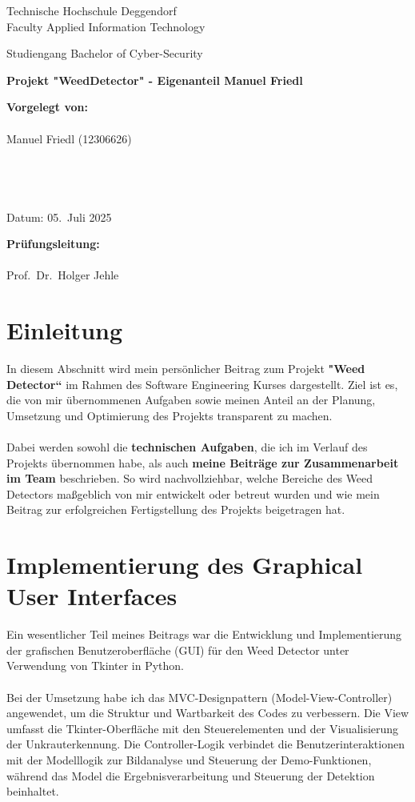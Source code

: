 \documentclass[12pt, a4paper]{scrreprt}
\newcommand{\faculty}{Faculty Applied Information Technology}
\newcommand{\studies}{Bachelor of Cyber-Security}
\newcommand{\thesistitleDE}{Projekt "WeedDetector" - Eigenanteil Manuel Friedl}
\newcommand{\submissiondate}{05.\ Juli 2025}
\newcommand{\supervisor}{Prof.\ Dr.\ Holger Jehle}
\begin{document}
\begin{titlepage}
  \centering
  {\LARGE Technische Hochschule Deggendorf \\ \faculty \par}
  \vspace{0.3cm}
  {\Large Studiengang \studies \\[1.5cm]}
  {\Huge\bfseries \thesistitleDE\par}
  \vfill
  \begin{minipage}[t]{0.45\textwidth}
    \textbf{Vorgelegt von:}\\
    \\
    Manuel Friedl (12306626)\\
    \\
    \\
    \\
    \\
    Datum: \submissiondate
  \end{minipage}\hfill
  \begin{minipage}[t]{0.45\textwidth}
    \textbf{Prüfungsleitung:}\\
    \\
    \supervisor
  \end{minipage}
\end{titlepage}

\tableofcontents
\newpage

\chapter{Einleitung}
In diesem Abschnitt wird mein persönlicher Beitrag zum Projekt \textbf{"Weed Detector“} im Rahmen des Software Engineering Kurses dargestellt. Ziel ist es, die von mir übernommenen Aufgaben sowie meinen Anteil an der Planung, Umsetzung und Optimierung des Projekts transparent zu machen.\\
\\
Dabei werden sowohl die \textbf{technischen Aufgaben}, die ich im Verlauf des Projekts übernommen habe, als auch \textbf{meine Beiträge zur Zusammenarbeit im Team} beschrieben. So wird nachvollziehbar, welche Bereiche des Weed Detectors maßgeblich von mir entwickelt oder betreut wurden und wie mein Beitrag zur erfolgreichen Fertigstellung des Projekts beigetragen hat.

\chapter{Implementierung des Graphical User Interfaces}
Ein wesentlicher Teil meines Beitrags war die Entwicklung und Implementierung der grafischen Benutzeroberfläche (GUI) für den Weed Detector unter Verwendung von Tkinter in Python.\\
\\
Bei der Umsetzung habe ich das MVC-Designpattern (Model-View-Controller) angewendet, um die Struktur und Wartbarkeit des Codes zu verbessern. Die View umfasst die Tkinter-Oberfläche mit den Steuerelementen und der Visualisierung der Unkrauterkennung. Die Controller-Logik verbindet die Benutzerinteraktionen mit der Modelllogik zur Bildanalyse und Steuerung der Demo-Funktionen, während das Model die Ergebnisverarbeitung und Steuerung der Detektion beinhaltet.
\end{document}
